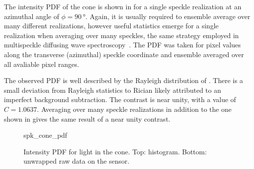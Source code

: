 The intensity PDF of the cone is shown in  for a single
speckle realization at an azimuthal angle of $\phi=\SI{90}{\degree}$.  Again,
it is usually required to ensemble average over many different realizations,
however useful statistics emerge for a single realization when averaging over
many speckles, the same strategy employed in multispeckle diffusing wave
spectroscopy~\cite{zakharov2006multispeckle}.  The PDF was taken for pixel
values along the transverse (azimuthal) speckle coordinate and ensemble
averaged over all avaliable pixel ranges.

The observed PDF is well described by the Rayleigh distribution of
.  There is a small deviation from Rayleigh statistics to
Rician likely attributed to an imperfect background subtraction.  The contrast
is near unity, with a value of $C=1.0637$.  Averaging over many speckle
realizations in addition to the one shown in  gives the
same result of a near unity contrast.  
\begin{figure}[ht]
\centering
{spk_cone_pdf}
\caption{Intensity PDF for light in the cone.  Top: histogram.  Bottom:
unwrapped raw data on the sensor.}
\label{fig:conepdf}
\end{figure}
